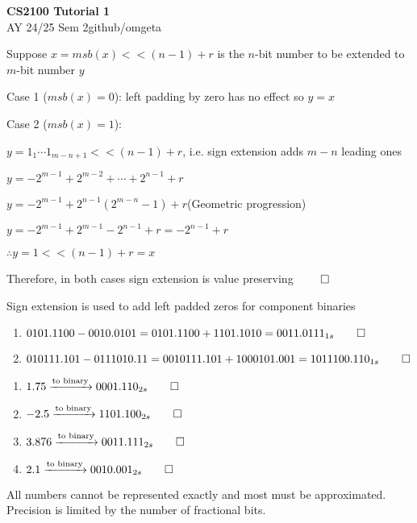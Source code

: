 \documentclass[12pt, a4paper]{article}
\newcommand{\mytitle}{CS2100 Tutorial 1}
\newcommand{\myauthor}{github/omgeta}
\newcommand{\mydate}{AY 24/25 Sem 2}
\begin{document}
\raggedright
\footnotesize
\begin{center}
{\normalsize{\textbf{\mytitle}}} \\
{\footnotesize{\mydate\hspace{2pt}\textemdash\hspace{2pt}\myauthor}}
\end{center}
\begin{enumerate}[Q\arabic*.]
  \item 
    \begin{enumproof}
    \item Suppose $x = msb(x) << (n-1) + r$ is the $n$-bit number to be extended to $m$-bit number $y$
    \item Case 1 ($msb(x) = 0$): left padding by zero has no effect so $y=x$
    \item Case 2 ($msb(x) = 1$):
      \begin{enumproof}
      \item $y = 1_1\cdots 1_{m-n+1} << (n-1) + r$, i.e. sign extension adds $m-n$ leading ones
      \item $y = -2^{m-1} + 2^{m-2} + \cdots + 2^{n-1} + r$
      \item $y = -2^{m-1} + 2^{n-1}(2^{m-n}-1) + r$\hfill(Geometric progression)
      \item $y = -2^{m-1} + 2^{m-1} - 2^{n-1} + r = -2^{n-1} + r$
      \item $\therefore y = 1 << (n-1) + r = x$
      \end{enumproof}
    \item Therefore, in both cases sign extension is value preserving $\qed$
    \end{enumproof}

  \item Sign extension is used to add left padded zeros for component binaries
    \begin{enumerate}[\alph*.]
      \item $0101.1100 - 0010.0101 = 0101.1100 + 1101.1010 = 0011.0111_{1s} \qed$
      \item $010111.101 - 0111010.11 = 0010111.101 + 1000101.001 = 1011100.110_{1s} \qed$
    \end{enumerate}

  \item 
    \begin{enumerate}[\alph*.]
      \item $1.75 \xrightarrow{\text{to binary}}0001.110_{2s} \qed$
      \item $-2.5 \xrightarrow{\text{to binary}}1101.100_{2s} \qed$
      \item $3.876 \xrightarrow{\text{to binary}}0011.111_{2s} \qed$
      \item $2.1 \xrightarrow{\text{to binary}}0010.001_{2s} \qed$
    \end{enumerate}
    All numbers cannot be represented exactly and most must be approximated. Precision is limited by the number of fractional bits.


\end{enumerate}
\end{document}
